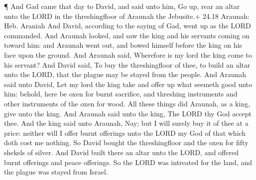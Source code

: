  ¶ And Gad came that day to David, and said unto him, Go
up, rear an altar unto the LORD in the threshingfloor of Araunah the
Jebusite.+ 24.18 Araunah: Heb. Araniah  And David,
according to the saying of Gad, went up as the LORD commanded.
 And Araunah looked, and saw the king and his servants
coming on toward him: and Araunah went out, and bowed himself before the
king on his face upon the ground.  And Araunah said,
Wherefore is my lord the king come to his servant? And David said, To
buy the threshingfloor of thee, to build an altar unto the LORD, that
the plague may be stayed from the people.  And Araunah said
unto David, Let my lord the king take and offer up what seemeth good
unto him: behold, here be oxen for burnt sacrifice, and threshing
instruments and other instruments of the oxen for wood. 
All these things did Araunah, as a king, give unto the king. And Araunah
said unto the king, The LORD thy God accept thee.  And the
king said unto Araunah, Nay; but I will surely buy it of thee at a
price: neither will I offer burnt offerings unto the LORD my God of that
which doth cost me nothing. So David bought the threshingfloor and the
oxen for fifty shekels of silver.  And David built there an
altar unto the LORD, and offered burnt offerings and peace offerings. So
the LORD was intreated for the land, and the plague was stayed from
Israel.
